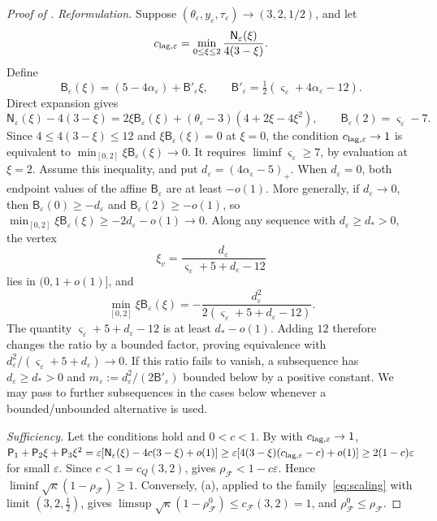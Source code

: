 \documentclass[11pt]{article}
\theoremstyle{definition}
\theoremstyle{remark}
\newcommand{\cF}{\mathcal F}
\newcommand{\sfP}{\mathsf P}
\newcommand{\rhoF}{\rho_{\cF}}
\newcommand{\rhoz}{\rho_{\cF}^{0}}
\newcommand{\cQ}{c_{Q}}
\newcommand{\cFF}{c_{\cF}}
\begin{document}
\begin{proof}[Proof of ]

\emph{Reformulation.}  Suppose
\((\theta_\varepsilon,y_\varepsilon,\tau_\varepsilon)
\to(3,2,1/2)\), and let
\[
c_{{\rm lag},\varepsilon}=\min_{0\le\xi\le2}
\frac{\mathsf N_\varepsilon(\xi)}{4(3-\xi)}.
\]
Define
\[
\mathsf B_\varepsilon(\xi)
=(5-4\alpha_\varepsilon)+\mathsf B'_\varepsilon\xi,
\qquad
\mathsf B'_\varepsilon=
\tfrac12(\varsigma_\varepsilon+4\alpha_\varepsilon-12).
\]
Direct expansion gives
\[
\mathsf N_\varepsilon(\xi)-4(3-\xi)
=2\xi\mathsf B_\varepsilon(\xi)
+(\theta_\varepsilon-3)(4+2\xi-4\xi^2),
\qquad \mathsf B_\varepsilon(2)=\varsigma_\varepsilon-7.
\]
Since \(4\le4(3-\xi)\le12\) and \(\xi\mathsf B_\varepsilon(\xi)=0\)
at \(\xi=0\), the condition \(c_{{\rm lag},\varepsilon}\to1\)
is equivalent to \(\min_{[0,2]}\xi\mathsf B_\varepsilon(\xi)\to0\).
It requires \(\liminf\varsigma_\varepsilon\ge7\), by evaluation at
\(\xi=2\).  Assume this inequality, and put
\(d_\varepsilon=(4\alpha_\varepsilon-5)_+\).
When \(d_\varepsilon=0\), both endpoint values of the affine
\(\mathsf B_\varepsilon\) are at least \(-o(1)\).
More generally, if \(d_\varepsilon\to0\), then
\(\mathsf B_\varepsilon(0)\ge-d_\varepsilon\) and
\(\mathsf B_\varepsilon(2)\ge-o(1)\), so
\(\min_{[0,2]}\xi\mathsf B_\varepsilon(\xi)
\ge-2d_\varepsilon-o(1)\to0\).
Along any sequence with \(d_\varepsilon\ge d_*>0\), the vertex
\[
\xi_v=\frac{d_\varepsilon}
{\varsigma_\varepsilon+5+d_\varepsilon-12}
\]
lies in \((0,1+o(1)]\), and
\[
\min_{[0,2]}\xi\mathsf B_\varepsilon(\xi)
=-\frac{d_\varepsilon^2}
{2(\varsigma_\varepsilon+5+d_\varepsilon-12)}.
\]
The quantity \(\varsigma_\varepsilon+5+d_\varepsilon-12\) is at least
\(d_*-o(1)\).  Adding \(12\) therefore changes the ratio by a bounded
factor, proving equivalence with
\(d_\varepsilon^2/(\varsigma_\varepsilon+5+d_\varepsilon)\to0\).
If this ratio fails to vanish, a subsequence has
\(d_\varepsilon\ge d_*>0\) and
\(m_\varepsilon:=d_\varepsilon^2/(2\mathsf B'_\varepsilon)\)
bounded below by a positive constant.  We may pass to further
subsequences in the cases below whenever a bounded/unbounded alternative
is used.

\emph{Sufficiency.}  Let the conditions hold and \(0<c<1\).  By  with \(c_{{\rm lag},\varepsilon}\to1\),
\(\sfP_1+\sfP_2\xi+\sfP_3\xi^2=\varepsilon[\mathsf N_\varepsilon(\xi)-4c(3-\xi)+o(1)]\ge\varepsilon[4(3-\xi)(c_{{\rm lag},\varepsilon}-c)+o(1)]\ge2(1-c)\varepsilon\) for small
\(\varepsilon\).  Since \(c<1=\cQ(3,2)\),  gives \(\rhoF<1-c\varepsilon\).  Hence \(\liminf\sqrt\kappa(1-\rhoF)\ge1\).  Conversely,
(a), applied to the family~\eqref{eq:scaling} with limit \((3,2,\frac12)\), gives \(\limsup\sqrt\kappa(1-\rhoz)\le\cFF(3,2)=1\), and \(\rhoz\le\rhoF\).


\end{proof}
\end{document}
